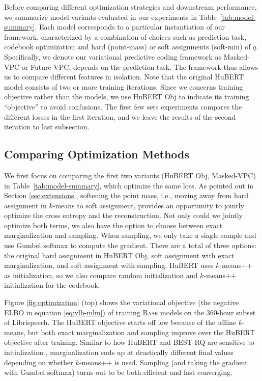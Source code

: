 \documentclass[11pt,a4paper]{article}
\begin{document}
Before comparing different optimization strategies and downstream performance, we summarize 
model variants evaluated in our experiments in Table~\ref{tab:model-summary}.
Each model corresponds to a particular instantiation of our framework, characterized by a combination of choices such as prediction task, codebook optimization and hard (point-mass) or soft assignments (soft-min) of $q$.
Specifically, we denote our variational predictive coding framework as Masked-VPC or Future-VPC, depends on 
the prediction task.
The framework thus allows us to compare different features in isolation.
Note that the original HuBERT model \citep{hsu2021hubert} consists of two or more training iterations.
Since we concerns training objective rather than the models, 
we use HuBERT Obj to indicate its training ``objective'' to avoid confusions.
The first few sets experiments compares the different losses
in the first iteration, and we leave the results of the second
iteration to last subsection.

\subsection{Comparing Optimization Methods}
\label{sec:opt}

We first focus on comparing the first two variants (HuBERT Obj, Masked-VPC) in Table~\ref{tab:model-summary}, which optimize the same loss.
As pointed out in Section \ref{sec:extensions}, softening the point mass, i.e., moving away from hard assignment in $k$-means to soft assignment, provides an opportunity to jointly optimize the cross entropy and the reconstruction.
Not only could we jointly optimize both terms, we also have the option to choose between exact marginalization and sampling.
When sampling, we only take a single sample and use Gumbel softmax to compute the gradient.
There are a total of three options: the original hard assignment in HuBERT Obj, soft assignment with exact marginalization, and soft assignment with sampling.
HuBERT uses $k$-means++ \citep{arthur2006k} as initialization, so we also compare random initialization and $k$-means++ initialization for the codebook.

Figure \ref{fig:optimization} (top) shows the variational objective (the negative ELBO in equation \ref{eq:vlb-mlm}) of training \textsc{Base} models on the 360-hour subset of Librispeech.
The HuBERT objective starts off low because of the offline $k$-means, but both exact marginalization and sampling improve over the HuBERT objective after training.
Similar to how HuBERT and BEST-RQ are sensitive to initialization \cite{chiu2022self}, marginalization ends up at drastically different final values depending on whether $k$-means++ is used.
Sampling (and taking the gradient with Gumbel softmax) turns out to be both efficient and fast converging.
\end{document}
